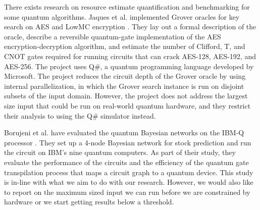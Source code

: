 \documentclass[10pt]{proc}
\theoremstyle{definition}
\theoremstyle{remark}
\begin{document}
There exists research on resource estimate quantification and benchmarking for
some quantum algorithms. Jaques et al. implemented Grover oracles for key
search on AES and LowMC encryption \cite{canteaut_implementing_2020}. They lay
out a formal description of the oracle,  describe a reversible quantum-gate
implementation of the AES encryption-decryption algorithm, and estimate the
number of Clifford, T, and CNOT gates required for running circuits that can
crack AES-128, AES-192, and AES-256. The project uses Q\#, a quantum
programming language developed by Microsoft. The project reduces the circuit
depth of the Grover oracle by using internal parallelization, in which the
Grover search instance is run on disjoint subsets of the input domain. However,
the project does not address the largest size input that could be run on
real-world quantum hardware, and they restrict their analysis to using the Q\#
simulator instead.

Borujeni et al. have evaluated the quantum Bayesian networks on the IBM-Q
processor \cite{borujeni_experimental_2020}. They set up a 4-node Bayesian
network for stock prediction and run the circuit on IBM’s nine quantum
computers. As part of their study, they evaluate the performance of the
circuits and the efficiency of the quantum gate transpilation process that maps
a circuit graph to a quantum device. This study is in-line with what we aim to
do with our research. However, we would also like to report on the maximum
sized input we can run before we are constrained by hardware or we start
getting results below a threshold. 
\end{document}
